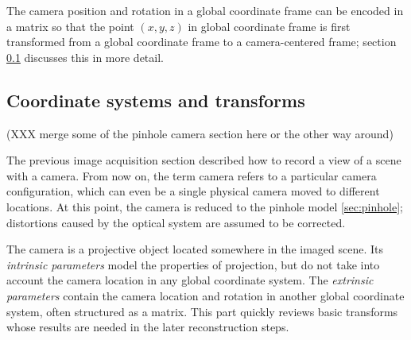 The camera position and rotation in a global coordinate frame can be encoded in a matrix so that the point $(x,y,z)$ in global coordinate frame is first transformed from a global coordinate frame to a camera-centered frame; section \ref{sec:coord} discusses this in more detail.


\subsection{Coordinate systems and transforms} \label{sec:coord} %

(XXX merge some of the pinhole camera section here or the other way around)




The previous image acquisition section described how to record a view of a scene with a camera. From now on, the term camera refers to a particular camera configuration, which can even be a single physical camera moved to different locations.
At this point, the camera is reduced to the pinhole model \ref{sec:pinhole}; distortions caused by the optical system are assumed to be corrected.


The camera is a projective object located somewhere in the imaged scene.
Its \emph{intrinsic parameters} model the properties of projection, but do not take into account the camera location in any global coordinate system.
The \emph{extrinsic parameters} contain the camera location and rotation in another global coordinate system, often structured as a matrix.
\cite{hartley03multiview,heyden2005multiple}
This part quickly reviews basic transforms whose results are needed in the later reconstruction steps.



